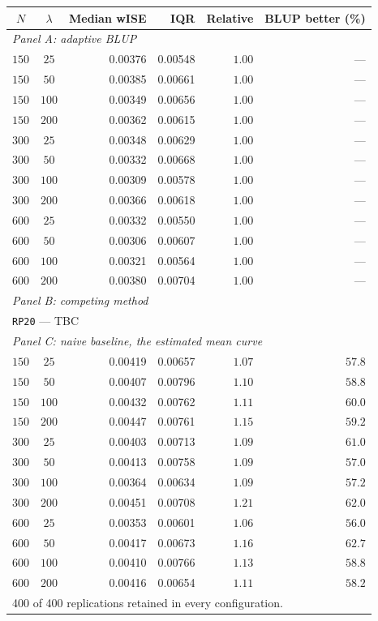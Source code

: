 \begin{tabular}{ccrrrr}
\hline
$N$ & $\lambda$ & Median wISE & IQR & Relative & BLUP better (\%) \\
\hline
\multicolumn{6}{l}{\textit{Panel A: adaptive BLUP}} \\
$150$ & $25$ & 0.00376 & 0.00548 & $1.00$ & --- \\
$150$ & $50$ & 0.00385 & 0.00661 & $1.00$ & --- \\
$150$ & $100$ & 0.00349 & 0.00656 & $1.00$ & --- \\
$150$ & $200$ & 0.00362 & 0.00615 & $1.00$ & --- \\
$300$ & $25$ & 0.00348 & 0.00629 & $1.00$ & --- \\
$300$ & $50$ & 0.00332 & 0.00668 & $1.00$ & --- \\
$300$ & $100$ & 0.00309 & 0.00578 & $1.00$ & --- \\
$300$ & $200$ & 0.00366 & 0.00618 & $1.00$ & --- \\
$600$ & $25$ & 0.00332 & 0.00550 & $1.00$ & --- \\
$600$ & $50$ & 0.00306 & 0.00607 & $1.00$ & --- \\
$600$ & $100$ & 0.00321 & 0.00564 & $1.00$ & --- \\
$600$ & $200$ & 0.00380 & 0.00704 & $1.00$ & --- \\
\hline
\multicolumn{6}{l}{\textit{Panel B: competing method}} \\
\multicolumn{6}{l}{\texttt{RP20} --- TBC} \\
\hline
\multicolumn{6}{l}{\textit{Panel C: naive baseline, the estimated mean curve}} \\
$150$ & $25$ & 0.00419 & 0.00657 & $1.07$ & $57.8$ \\
$150$ & $50$ & 0.00407 & 0.00796 & $1.10$ & $58.8$ \\
$150$ & $100$ & 0.00432 & 0.00762 & $1.11$ & $60.0$ \\
$150$ & $200$ & 0.00447 & 0.00761 & $1.15$ & $59.2$ \\
$300$ & $25$ & 0.00403 & 0.00713 & $1.09$ & $61.0$ \\
$300$ & $50$ & 0.00413 & 0.00758 & $1.09$ & $57.0$ \\
$300$ & $100$ & 0.00364 & 0.00634 & $1.09$ & $57.2$ \\
$300$ & $200$ & 0.00451 & 0.00708 & $1.21$ & $62.0$ \\
$600$ & $25$ & 0.00353 & 0.00601 & $1.06$ & $56.0$ \\
$600$ & $50$ & 0.00417 & 0.00673 & $1.16$ & $62.7$ \\
$600$ & $100$ & 0.00410 & 0.00766 & $1.13$ & $58.8$ \\
$600$ & $200$ & 0.00416 & 0.00654 & $1.11$ & $58.2$ \\
\hline
\multicolumn{6}{l}{\footnotesize 400 of 400 replications retained in every configuration.} \\
\end{tabular}

